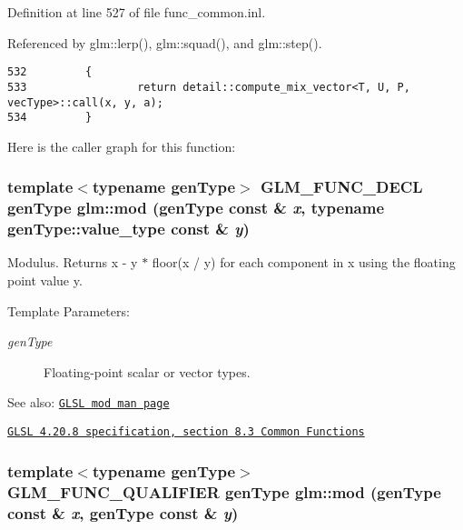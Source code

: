  

Definition at line 527 of file func\_\-common.inl.

Referenced by glm::lerp(), glm::squad(), and glm::step().

\begin{Code}\begin{verbatim}532         {
533                 return detail::compute_mix_vector<T, U, P, vecType>::call(x, y, a);
534         }
\end{verbatim}
\end{Code}




Here is the caller graph for this function:\hypertarget{group__core__func__common_ge03755d98416b59e5d791665c6b6895a}{
\subsubsection[mod]{\setlength{\rightskip}{0pt plus 5cm}template$<$typename genType$>$ GLM\_\-FUNC\_\-DECL genType glm::mod (genType const \& {\em x}, \/  typename genType::value\_\-type const \& {\em y})}}
\label{group__core__func__common_ge03755d98416b59e5d791665c6b6895a}


Modulus. Returns x - y $\ast$ floor(x / y) for each component in x using the floating point value y.

\begin{Desc}
\item[Template Parameters:]
\begin{description}
\item[{\em genType}]Floating-point scalar or vector types.\end{description}
\end{Desc}
\begin{Desc}
\item[See also:]\href{http://www.opengl.org/sdk/docs/manglsl/xhtml/mod.xml}{\tt GLSL mod man page} 

\href{http://www.opengl.org/registry/doc/GLSLangSpec.4.20.8.pdf}{\tt GLSL 4.20.8 specification, section 8.3 Common Functions} \end{Desc}
\hypertarget{group__core__func__common_gffb813e4651fc91dbb906e46bff8ea8a}{
\subsubsection[mod]{\setlength{\rightskip}{0pt plus 5cm}template$<$typename genType$>$ GLM\_\-FUNC\_\-QUALIFIER genType glm::mod (genType const \& {\em x}, \/  genType const \& {\em y})}}
\label{group__core__func__common_gffb813e4651fc91dbb906e46bff8ea8a}


